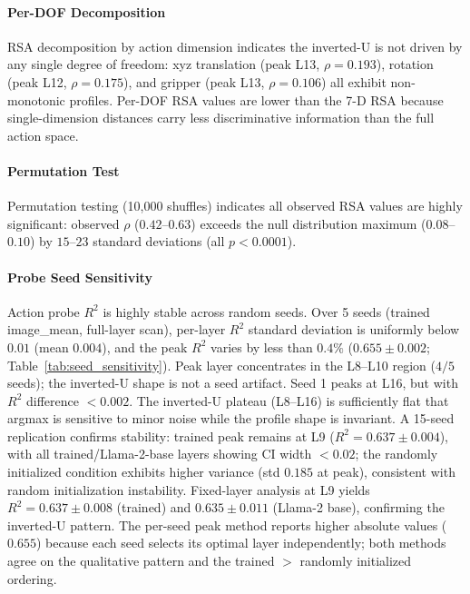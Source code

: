 \paragraph{Per-DOF Decomposition}
RSA decomposition by action dimension indicates the inverted-U is not driven by any single degree of freedom: xyz translation (peak L13, $\rho = 0.193$), rotation (peak L12, $\rho = 0.175$), and gripper (peak L13, $\rho = 0.106$) all exhibit non-monotonic profiles.
Per-DOF RSA values are lower than the 7-D RSA because single-dimension distances carry less discriminative information than the full action space.

\paragraph{Permutation Test}
Permutation testing (10{,}000 shuffles) indicates all observed RSA values are highly significant: observed $\rho$ ($0.42$--$0.63$) exceeds the null distribution maximum ($0.08$--$0.10$) by $15$--$23$ standard deviations (all $p < 0.0001$).

\paragraph{Probe Seed Sensitivity}
Action probe $R^2$ is highly stable across random seeds.
Over 5 seeds (trained image\_mean, full-layer scan), per-layer $R^2$ standard deviation is uniformly below $0.01$ (mean $0.004$), and the peak $R^2$ varies by less than $0.4\%$ ($0.655 \pm 0.002$; Table~\ref{tab:seed_sensitivity}).
Peak layer concentrates in the L8--L10 region ($4/5$ seeds); the inverted-U shape is not a seed artifact.
Seed 1 peaks at L16, but with $R^2$ difference ${<}0.002$. The inverted-U plateau (L8--L16) is sufficiently flat that argmax is sensitive to minor noise while the profile shape is invariant.
A 15-seed replication confirms stability: trained peak remains at L9 ($R^2 = 0.637 \pm 0.004$), with all trained/Llama-2-base layers showing CI width ${<}0.02$; the randomly initialized condition exhibits higher variance (std $0.185$ at peak), consistent with random initialization instability.
Fixed-layer analysis at L9 yields $R^2 = 0.637 \pm 0.008$ (trained) and $0.635 \pm 0.011$ (Llama-2 base), confirming the inverted-U pattern.
The per-seed peak method reports higher absolute values ($0.655$) because each seed selects its optimal layer independently; both methods agree on the qualitative pattern and the trained $>$ randomly initialized ordering.

